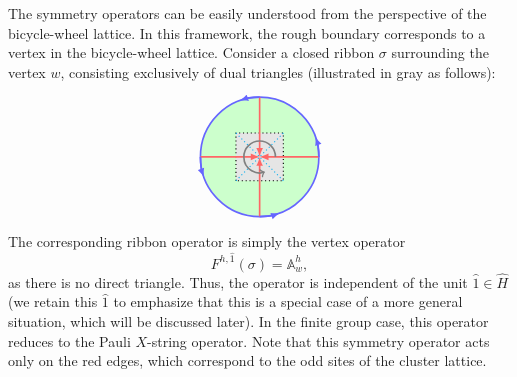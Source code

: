 \documentclass[a4paper,11pt]{article}
\theoremstyle{theorem}
\theoremstyle{remark}
\newcommand{\Av}{\mathbb{A}}
\begin{document}
The symmetry operators can be easily understood from the perspective of the bicycle-wheel lattice. In this framework, the rough boundary corresponds to a vertex in the bicycle-wheel lattice. Consider a closed ribbon $\sigma$ surrounding the vertex $w$, consisting exclusively of dual triangles (illustrated in gray as follows):

\begin{equation*}
    \begin{aligned}
\begin{tikzpicture}
    \filldraw[color=blue!60, fill=green!20, very thick](0,0) circle (1.5);
    
    \filldraw[fill=gray!20, draw=black, dotted, thick] (-0.6,-0.6) rectangle (0.6,0.6);
    
    \draw[dotted, cyan, thick] (-0.6,-0.6) -- (0,0);
    \draw[dotted, cyan, thick] (-0.6,0.6) -- (0,0);
    \draw[dotted, cyan, thick] (0.6,0.6) -- (0,0);
    \draw[dotted, cyan, thick] (0.6,-0.6) -- (0,0);
    
    \draw[latex-,red!60,very thick] (0,0) -- (0,-1.5); %
    \draw[latex-,red!60,very thick] (0,0) -- (0,1.5);  %
    \draw[latex-,red!60,very thick] (0,0) -- (1.5,0);  %
    \draw[latex-,red!60,very thick] (0,0) -- (-1.5,0); %
    
    \draw[blue!60, very thick, -latex] (1.5,0) arc (0:20:1.5);
    \draw[blue!60, very thick, -latex] (0,1.5) arc (90:110:1.5);
    \draw[blue!60, very thick, -latex] (-1.5,0) arc (180:200:1.5);
    \draw[blue!60, very thick, -latex] (0,-1.5) arc (270:290:1.5);
    
    \draw[gray, very thick, -to] (0.4,0) arc[start angle=0, end angle=290, radius=0.4];
\end{tikzpicture}
	\end{aligned}
\end{equation*}
The corresponding ribbon operator is simply the vertex operator 
\begin{equation}
    F^{h, \hat{1}}(\sigma) = \Av_w^h,
\end{equation}
as there is no direct triangle. Thus, the operator is independent of the unit $\hat{1} \in \hat{H}$ (we retain this $\hat{1}$ to emphasize that this is a special case of a more general situation, which will be discussed later). In the finite group case, this operator reduces to the Pauli $X$-string operator. Note that this symmetry operator acts only on the red edges, which correspond to the odd sites of the cluster lattice.
\end{document}

